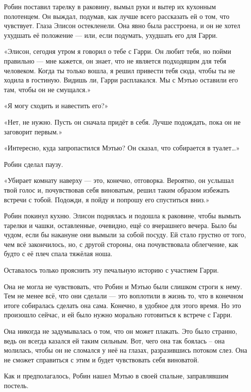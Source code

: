 \documentclass[a4paper,12pt]{book}
\begin{document}
\par
Робин поставил тарелку в раковину, вымыл руки и вытер их кухонным полотенцем. Он выждал, подумав, как лучше всего рассказать ей о том, что чувствует. Глаза Элисон остекленели. Она явно была расстроена, и он не хотел ухудшать её положение — или, если подумать, ухудшать его для Гарри.
\par
«Элисон, сегодня утром я говорил о тебе с Гарри. Он любит тебя, но пойми правильно — мне кажется, он знает, что не является подходящим для тебя человеком. Когда ты только вошла, я решил привести тебя сюда, чтобы ты не ходила в гостиную. Видишь ли, Гарри расплакался. Мы с Мэтью оставили его там, чтобы он не смущался.»
\par
«Я могу сходить и навестить его?»
\par
«Нет, не нужно. Пусть он сначала придёт в себя. Лучше подождать, пока он не заговорит первым.»
\par
«Интересно, куда запропастился Мэтью? Он сказал, что собирается в туалет…»
\par
Робин сделал паузу.
\par
«Убирает комнату наверху — это, конечно, отговорка. Вероятно, он услышал твой голос и, почувствовав себя виноватым, решил таким образом избежать встречи с тобой. Подожди, я пойду и попрошу его спуститься вниз.»
\par
Робин покинул кухню. Элисон поднялась и подошла к раковине, чтобы вымыть тарелки и чашки, оставленные, очевидно, ещё со вчерашнего вечера. Было бы чудом, если бы накануне они вымыли за собой посуду. Ей стало грустно от того, чем всё закончилось, но, с другой стороны, она почувствовала облегчение, как будто с её плеч спала тяжёлая ноша.
\par
Оставалось только прояснить эту печальную историю с участием Гарри.
\par
Она не могла не чувствовать, что Робин и Мэтью были слишком строги к нему. Тем не менее всё, что они сделали — это воплотили в жизнь то, что в конечном итоге собиралась сделать она сама. Конечно, в удобное для этого время. Но это произошло сейчас, и ей было нужно морально готовиться к встрече с Гарри.
\par
Она никогда не задумывалась о том, что он может плакать. Это было странно, ведь он всегда казался ей таким сильным. Вот, чего она так боялась – она молилась, чтобы он не сломался у неё на глазах,  разразившись потоком слез. Она не сможет справиться с этим и будет чувствовать себя виноватой.
\par
Как и предполагалось, Робин нашел Мэтью в своей спальне, заправлявшим постель.
\end{document}
